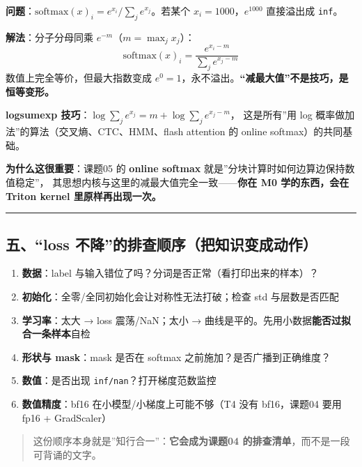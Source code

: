 \documentclass[
  chinese,
  11pt,
]{ctexart}
\providecommand{\tightlist}{%
  \setlength{\itemsep}{0pt}\setlength{\parskip}{0pt}}
\begin{document}
\textbf{问题}：\(\mathrm{softmax}(x)_i = e^{x_i}/\sum_j e^{x_j}\)。若某个 \(x_i = 1000\)，\(e^{1000}\) 直接溢出成 \texttt{inf}。

\textbf{解法}：分子分母同乘 \(e^{-m}\)（\(m=\max_j x_j\)）： \[\mathrm{softmax}(x)_i = \frac{e^{x_i-m}}{\sum_j e^{x_j-m}}\] 数值上完全等价，但最大指数变成 \(e^0=1\)，永不溢出。\textbf{``减最大值''不是技巧，是恒等变形。}

\textbf{logsumexp 技巧}：\(\log\sum_j e^{x_j} = m + \log\sum_j e^{x_j - m}\)， 这是所有''用 log 概率做加法''的算法（交叉熵、CTC、HMM、flash attention 的 online softmax）的共同基础。

\textbf{为什么这很重要}：课题05 的 \textbf{online softmax} 就是''分块计算时如何边算边保持数值稳定''， 其思想内核与这里的减最大值完全一致------\textbf{你在 M0 学的东西，会在 Triton kernel 里原样再出现一次。}

\begin{center}\rule{0.5\linewidth}{0.5pt}\end{center}

\subsection{五、``loss 不降''的排查顺序（把知识变成动作）}\label{ux4e94loss-ux4e0dux964dux7684ux6392ux67e5ux987aux5e8fux628aux77e5ux8bc6ux53d8ux6210ux52a8ux4f5c}

\begin{enumerate}
\def\labelenumi{\arabic{enumi}.}
\tightlist
\item
  \textbf{数据}：label 与输入错位了吗？分词是否正常（看打印出来的样本）？
\item
  \textbf{初始化}：全零/全同初始化会让对称性无法打破；检查 std 与层数是否匹配
\item
  \textbf{学习率}：太大 → loss 震荡/NaN；太小 → 曲线是平的。先用小数据\textbf{能否过拟合一条样本}自检
\item
  \textbf{形状与 mask}：mask 是否在 softmax 之前施加？是否广播到正确维度？
\item
  \textbf{数值}：是否出现 \texttt{inf/nan}？打开梯度范数监控
\item
  \textbf{数值精度}：bf16 在小模型/小梯度上可能不够（T4 没有 bf16，课题04 要用 fp16 + GradScaler）
\end{enumerate}

\begin{quote}
这份顺序本身就是''知行合一''：\textbf{它会成为课题04 的排查清单}，而不是一段可背诵的文字。
\end{quote}
\end{document}
